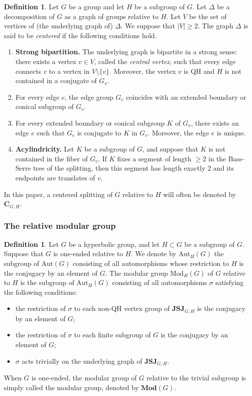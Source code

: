 \documentclass[a4paper, 11pt]{amsart}
\theoremstyle{definition}
\newtheorem{de}[te]{Definition}
\theoremstyle{remark}
\renewcommand{\geq}{\geqslant}
\begin{document}
\begin{de}\label{centered}Let $G$ be a group and let $H$ be a subgroup of $G$. Let $\Delta$ be a decomposition of $G$ as a graph of groups relative to $H$. Let $V$ be the set of vertices of (the underlying graph of) $\Delta$. We suppose that $\vert V\vert \geq 2$. The graph $\Delta$ is said to be \emph{centered} if the following conditions hold.
\begin{enumerate}[(1)]
\item \textbf{Strong bipartition.} The underlying graph is bipartite in a strong sense: there exists a vertex $v\in V$, called the \emph{central vertex}, such that every edge connects $v$ to a vertex in $V\setminus \lbrace v\rbrace$. Moreover, the vertex $v$ is QH and $H$ is not contained in a conjugate of $G_v$. %
\item For every edge $e$, the edge group $G_e$ coincides with an extended boundary or conical subgroup of $G_v$.
\item For every extended boundary or conical subgroup $K$ of $G_v$, there exists an edge $e$ such that $G_e$ is conjugate to $K$ in $G_v$. Moreover, the edge $e$ is unique.
\item \textbf{Acylindricity.} Let $K$ be a subgroup of $G$, and suppose that $K$ is not contained in the fiber of $G_v$. If $K$ fixes a segment of length $\geq 2$ in the Bass-Serre tree of the splitting, then this segment has length exactly 2 and its endpoints are translates of $v$.
\end{enumerate}
In this paper, a centered splitting of $G$ relative to $H$ will often be denoted by $\mathbf{C}_{G,H}$.
\end{de} 

\subsubsection{The relative modular group}

\begin{de}Let $G$ be a hyperbolic group, and let $H\subset G$ be a subgroup of $G$. Suppose that $G$ is one-ended relative to $H$. We denote by $\mathrm{Aut}_H(G)$ the subgroup of $\mathrm{Aut}(G)$ consisting of all automorphisms whose restriction to $H$ is the conjugacy by an element of $G$. The modular group $\mathrm{Mod}_H(G)$ of $G$ relative to $H$ is the subgroup of $\mathrm{Aut}_H(G)$ consisting of all automorphisms $\sigma$ satisfying the following conditions:
\begin{itemize}
    \item the restriction of $\sigma$ to each non-QH vertex group of $\mathbf{JSJ}_{G,H}$ is the conjugacy by an element of $G$;
    \item the restriction of $\sigma$ to each finite subgroup of $G$ is the conjugacy by an element of $G$;
    \item $\sigma$ acts trivially on the underlying graph of $\mathbf{JSJ}_{G,H}$.
\end{itemize}
When $G$ is one-ended, the modular group of $G$ relative to the trivial subgroup is simply called the modular group, denoted by $\mathbf{Mod}(G)$.
\end{de}
\end{document}
